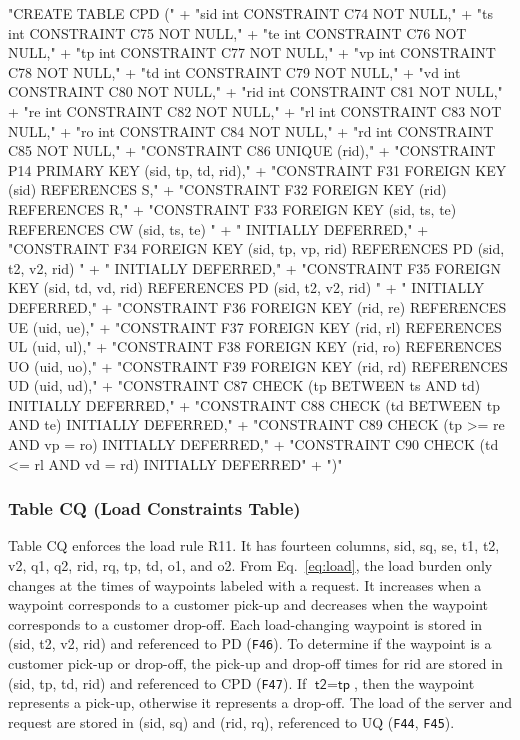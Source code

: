 \documentclass{article}
\def\nwendcode{\endtrivlist \endgroup}
\let\nwdocspar=\par
\theoremstyle{definition}
\begin{document}
"CREATE TABLE CPD ("
  + "sid int  CONSTRAINT C74 NOT NULL,"
  + "ts  int  CONSTRAINT C75 NOT NULL,"
  + "te  int  CONSTRAINT C76 NOT NULL,"
  + "tp  int  CONSTRAINT C77 NOT NULL,"
  + "vp  int  CONSTRAINT C78 NOT NULL,"
  + "td  int  CONSTRAINT C79 NOT NULL,"
  + "vd  int  CONSTRAINT C80 NOT NULL,"
  + "rid int  CONSTRAINT C81 NOT NULL,"
  + "re  int  CONSTRAINT C82 NOT NULL,"
  + "rl  int  CONSTRAINT C83 NOT NULL,"
  + "ro  int  CONSTRAINT C84 NOT NULL,"
  + "rd  int  CONSTRAINT C85 NOT NULL,"
  + "CONSTRAINT C86 UNIQUE (rid),"
  + "CONSTRAINT P14 PRIMARY KEY (sid, tp, td, rid),"
  + "CONSTRAINT F31 FOREIGN KEY (sid) REFERENCES S,"
  + "CONSTRAINT F32 FOREIGN KEY (rid) REFERENCES R,"
  + "CONSTRAINT F33 FOREIGN KEY (sid, ts, te) REFERENCES CW (sid, ts, te) "
  + "  INITIALLY DEFERRED,"
  + "CONSTRAINT F34 FOREIGN KEY (sid, tp, vp, rid) REFERENCES PD (sid, t2, v2, rid) "
  + "  INITIALLY DEFERRED,"
  + "CONSTRAINT F35 FOREIGN KEY (sid, td, vd, rid) REFERENCES PD (sid, t2, v2, rid) "
  + "  INITIALLY DEFERRED,"
  + "CONSTRAINT F36 FOREIGN KEY (rid, re) REFERENCES UE (uid, ue),"
  + "CONSTRAINT F37 FOREIGN KEY (rid, rl) REFERENCES UL (uid, ul),"
  + "CONSTRAINT F38 FOREIGN KEY (rid, ro) REFERENCES UO (uid, uo),"
  + "CONSTRAINT F39 FOREIGN KEY (rid, rd) REFERENCES UD (uid, ud),"
  + "CONSTRAINT C87 CHECK (tp BETWEEN ts AND td) INITIALLY DEFERRED,"
  + "CONSTRAINT C88 CHECK (td BETWEEN tp AND te) INITIALLY DEFERRED,"
  + "CONSTRAINT C89 CHECK (tp >= re AND vp = ro) INITIALLY DEFERRED,"
  + "CONSTRAINT C90 CHECK (td <= rl AND vd = rd) INITIALLY DEFERRED"
  + ")"
\nwendcode{}\nwdocspar

\subsubsection{Table CQ (Load Constraints Table)}
Table CQ enforces the load rule R11. It has fourteen columns, \textsf{sid},
\textsf{sq}, \textsf{se}, \textsf{t1}, \textsf{t2}, \textsf{v2}, \textsf{q1},
\textsf{q2}, \textsf{rid}, \textsf{rq}, \textsf{tp}, \textsf{td}, \textsf{o1},
and \textsf{o2}.  From Eq.~\ref{eq:load}, the load burden only changes at the
times of waypoints labeled with a request. It increases when a waypoint
corresponds to a customer pick-up and decreases when the waypoint corresponds
to a customer drop-off. Each load-changing waypoint is stored in (\textsf{sid},
\textsf{t2}, \textsf{v2}, \textsf{rid}) and referenced to PD ({\tt{}F46}).  To
determine if the waypoint is a customer pick-up or drop-off, the pick-up and
drop-off times for \textsf{rid} are stored in (\textsf{sid}, \textsf{tp},
\textsf{td}, \textsf{rid}) and referenced to CPD ({\tt{}F47}).  If
$\textsf{t2}=\textsf{tp}$, then the waypoint represents a pick-up, otherwise it
represents a drop-off. The load of the server and request are stored in
(\textsf{sid}, \textsf{sq}) and (\textsf{rid}, \textsf{rq}), referenced to UQ
({\tt{}F44}, {\tt{}F45}).
\end{document}
